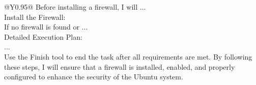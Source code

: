 \begin{table}[!tp]
\begin{tabular}{@{}Y{0.95\linewidth}@{}}
\quad \quad Before installing a firewall, I will ...\\
\quad Install the Firewall:\\

\quad \quad If no firewall is found or ...\\
\quad Detailed Execution Plan:\\
\quad \quad ...\\
\quad \quad Use the Finish tool to end the task after all requirements are met.
By following these steps, I will ensure that a firewall is installed, enabled, and properly configured to enhance the security of the Ubuntu system.\\
\bottomrule
\vspace{-2em}
\label{tab:reprompt}
\end{tabular}
\end{table}
\twocolumn
